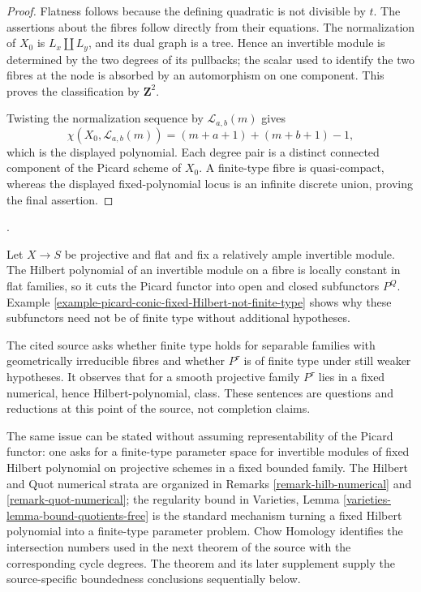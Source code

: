 \begin{proof}
Flatness follows because the defining quadratic is not divisible by $t$.
The assertions about the fibres follow directly from their equations. The
normalization of $X_0$ is $L_x\amalg L_y$, and its dual graph is a tree.
Hence an invertible module is determined by the two degrees of its pullbacks;
the scalar used to identify the two fibres at the node is absorbed by an
automorphism on one component. This proves the classification by
$\mathbf Z^2$.

Twisting the normalization sequence by $\mathcal{L}_{a,b}(m)$ gives
$$
\chi(X_0,\mathcal{L}_{a,b}(m))
=(m+a+1)+(m+b+1)-1,
$$
which is the displayed polynomial. Each degree pair is a distinct connected
component of the Picard scheme of $X_0$. A finite-type fibre is
quasi-compact, whereas the displayed fixed-polynomial locus is an infinite
discrete union, proving the final assertion.
\end{proof}

\begin{remark}
\label{remark-picard-boundedness-history}
\begin{reference}
\cite[Expos\'e 236, Section 4, pp. 241--242]{FGA}.
\end{reference}
Let $X\to S$ be projective and flat and fix a relatively ample invertible
module. The Hilbert polynomial of an invertible module on a fibre is locally
constant in flat families, so it cuts the Picard functor into open and closed
subfunctors $P^Q$. Example
\ref{example-picard-conic-fixed-Hilbert-not-finite-type} shows why these
subfunctors need not be of finite type without additional hypotheses.

The cited source asks whether finite type holds for separable families with
geometrically irreducible fibres and whether $P^\tau$ is of finite type under
still weaker hypotheses. It observes that for a smooth projective family
$P^\tau$ lies in a fixed numerical, hence Hilbert-polynomial, class. These
sentences are questions and reductions at this point of the source, not
completion claims.

The same issue can be stated without assuming representability of the Picard
functor: one asks for a finite-type parameter space for invertible modules of
fixed Hilbert polynomial on projective schemes in a fixed bounded family.
The Hilbert and Quot numerical strata are organized in Remarks
\ref{remark-hilb-numerical} and \ref{remark-quot-numerical}; the regularity
bound in Varieties, Lemma
\ref{varieties-lemma-bound-quotients-free} is the standard mechanism turning
a fixed Hilbert polynomial into a finite-type parameter problem. Chow
Homology identifies the intersection numbers used in the next theorem of the
source with the corresponding cycle degrees. The theorem and its later
supplement supply the source-specific boundedness conclusions sequentially
below.
\end{remark}

